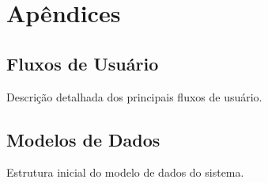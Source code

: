 \section{Apêndices}
\subsection{Fluxos de Usuário}
Descrição detalhada dos principais fluxos de usuário.

\subsection{Modelos de Dados}
Estrutura inicial do modelo de dados do sistema. 